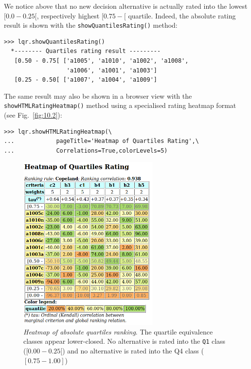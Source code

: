 We notice above that no new decision alternative is actually rated into the lowest $[0.0-0.25[$, respectively highest $[0.75- [$ quartile. Indeed, the absolute rating result is shown with the \texttt{showQuantilesRating()} method:
\begin{lstlisting}[caption={Absolute quartiles rating result},label=list:10.8]
>>> lqr.showQuantilesRating()
  *-------- Quartiles rating result ---------
   [0.50 - 0.75[ ['a1005', 'a1010', 'a1002', 'a1008',
                  'a1006', 'a1001', 'a1003']
   [0.25 - 0.50[ ['a1007', 'a1004', 'a1009']
\end{lstlisting}    

The same result may also be shown in a browser view with the \texttt{showHTMLRa\-tingHeatmap()} method using a specialised rating heatmap format (see Fig.~\vref{fig:10.2}): 
\begin{lstlisting}
>>> lqr.showHTMLRatingHeatmap(\
...            pageTitle='Heatmap of Quartiles Rating',\
...            Correlations=True,colorLevels=5)
\end{lstlisting}
\begin{figure}[ht]
\sidecaption[t]
 \includegraphics[width=7cm]{Figures/10-2-heatMap1.png}
\caption[Heatmap of absolute quartiles ranking]{\emph{Heatmap of absolute quartiles ranking}. The quartile equivalence classes appear lower-closed. No alternative is rated into the \texttt{Q1} class ($[0.00 - 0.25[$) and no alternative is rated into the Q4 class ($[0.75 - 1.00]$)}
\label{fig:10.2}       %
\end{figure}
	    
